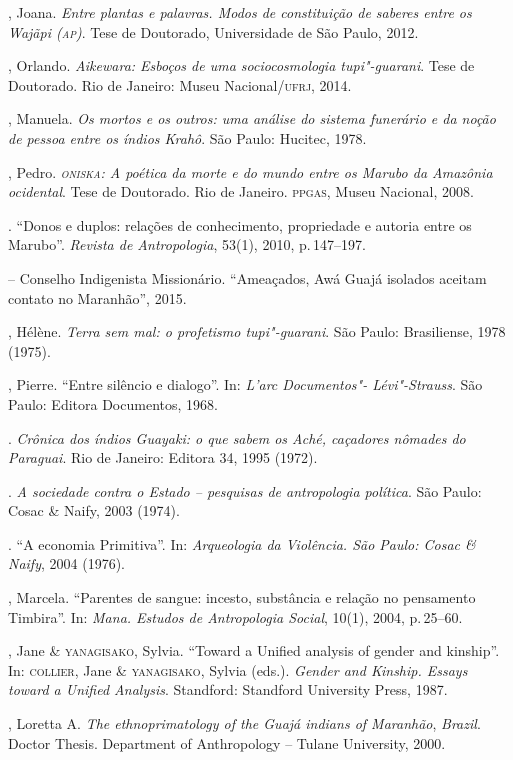 \begin{bibliohedra}
, Joana. \emph{Entre plantas e palavras. Modos de constituição de
saberes entre os Wajãpi (\textsc{ap})}. Tese de Doutorado, Universidade de São
Paulo, 2012.

, Orlando. \emph{Aikewara: Esboços de uma sociocosmologia tupi"-guarani}. Tese de Doutorado. Rio de Janeiro: Museu Nacional/\textsc{ufrj}, 2014.

, Manuela. \emph{Os mortos e os outros: uma análise do sistema
funerário e da noção de pessoa entre os índios Krahô}. São Paulo:
Hucitec, 1978.

, Pedro. \emph{\textsc{oniska}: A poética da morte e do mundo entre os
Marubo da Amazônia ocidental}. Tese de Doutorado. Rio de Janeiro. \textsc{ppgas},
Museu Nacional, 2008.

\titidem. ``Donos e duplos: relações de conhecimento, propriedade
e autoria entre os Marubo''. \emph{Revista de Antropologia}, 53(1), 2010, p.\,147--197.

 -- Conselho Indigenista Missionário. ``Ameaçados, Awá Guajá isolados aceitam contato no Maranhão'', 2015.

, Hélène. \emph{Terra sem mal: o profetismo tupi"-guarani}.
São Paulo: Brasiliense, 1978 (1975).

, Pierre. ``Entre silêncio e dialogo''. In: \emph{L'arc Documentos"-
Lévi"-Strauss}. São Paulo: Editora Documentos, 1968.

\titidem. \emph{Crônica dos índios Guayaki: o que sabem os
Aché, caçadores nômades do Paraguai}. Rio de Janeiro: Editora 34, 1995 (1972).

\titidem. \emph{A sociedade contra o Estado -- pesquisas de
antropologia política}. São Paulo: Cosac \& Naify, 2003 (1974).

\titidem. ``A economia Primitiva''. In: \emph{Arqueologia da
Violência. São Paulo: Cosac \& Naify}, 2004 (1976).

, Marcela. ``Parentes de sangue: incesto, substância e relação no
pensamento Timbira''. In: \emph{Mana. Estudos de Antropologia Social}, 10(1), 2004, p.\,25--60.

, Jane \& \textsc{yanagisako}, Sylvia.
``Toward a Unified analysis of gender and kinship''. In:
\textsc{collier}, Jane \& \textsc{yanagisako}, Sylvia (eds.). \emph{Gender and Kinship.
Essays toward a Unified Analysis}. Standford: Standford University
Press, 1987.

, Loretta A. \emph{The ethnoprimatology of the Guajá indians of
Maranhão}, \emph{Brazil}. Doctor Thesis. Department of Anthropology --
Tulane University, 2000.


\end{bibliohedra}
